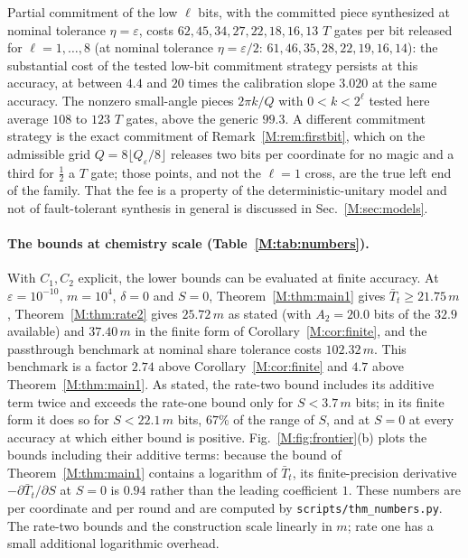 \documentclass[aps,prx,twocolumn,superscriptaddress,nofootinbib,longbibliography]{revtex4-2}
\theoremstyle{plain}
\theoremstyle{definition}
\theoremstyle{remark}
\begin{document}
Partial commitment of the low $\ell$ bits, with the committed piece synthesized at nominal tolerance $\eta=\varepsilon$, costs $62,45,34,27,22,18,16,13$ $T$ gates per bit released for $\ell=1,\dots,8$ (at nominal tolerance $\eta=\varepsilon/2$: $61,46,35,28,22,19,16,14$): the substantial cost of the tested low-bit commitment strategy persists at this accuracy, at between $4.4$ and $20$ times the calibration slope $3.020$ at the same accuracy. The nonzero small-angle pieces $2\pi k/Q$ with $0<k<2^\ell$ tested here average $108$ to $123$ $T$ gates, above the generic $99.3$. A different commitment strategy is the exact commitment of Remark~\ref{M:rem:firstbit}, which on the admissible grid $Q=8\lfloor Q_\varepsilon/8\rfloor$ releases two bits per coordinate for no magic and a third for $\tfrac12$ a $T$ gate; those points, and not the $\ell=1$ cross, are the true left end of the family. That the fee is a property of the deterministic-unitary model and not of fault-tolerant synthesis in general is discussed in Sec.~\ref{M:sec:models}.

\paragraph{The bounds at chemistry scale (Table~\ref{M:tab:numbers}).} With $C_1,C_2$ explicit, the lower bounds can be evaluated at finite accuracy. At $\varepsilon=10^{-10}$, $m=10^4$, $\delta=0$ and $S=0$, Theorem~\ref{M:thm:main1} gives $\bar T_t\ge21.75\,m$, Theorem~\ref{M:thm:rate2} gives $25.72\,m$ as stated (with $A_2=20.0$ bits of the $32.9$ available) and $37.40\,m$ in the finite form of Corollary~\ref{M:cor:finite}, and the passthrough benchmark at nominal share tolerance costs $102.32\,m$. This benchmark is a factor $2.74$ above Corollary~\ref{M:cor:finite} and $4.7$ above Theorem~\ref{M:thm:main1}. As stated, the rate-two bound includes its additive term twice and exceeds the rate-one bound only for $S<3.7\,m$ bits; in its finite form it does so for $S<22.1\,m$ bits, $67\%$ of the range of $S$, and at $S=0$ at every accuracy at which either bound is positive. Fig.~\ref{M:fig:frontier}(b) plots the bounds including their additive terms: because the bound of Theorem~\ref{M:thm:main1} contains a logarithm of $\bar T_t$, its finite-precision derivative $-\partial\bar T_t/\partial S$ at $S=0$ is $0.94$ rather than the leading coefficient $1$. These numbers are per coordinate and per round and are computed by \texttt{scripts/thm\_numbers.py}. The rate-two bounds and the construction scale linearly in $m$; rate one has a small additional logarithmic overhead.
\end{document}
